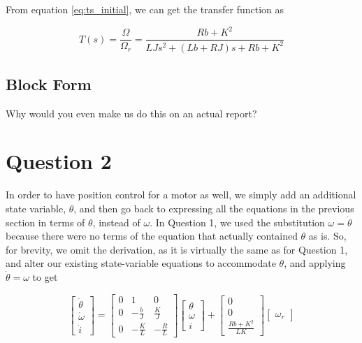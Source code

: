 \documentclass[a4paper, 12pt]{article}
\begin{document}
From equation \eqref{eq:ts_initial}, we can get the transfer function as

\begin{equation}
  T(s) = \frac{\Omega}{\Omega_r} = \frac{Rb + K^2}{LJs^2 + (Lb + RJ)s + Rb + K^2}
  \label{eq:ts_final}
\end{equation}

\subsection{Block Form}

Why would you even make us do this on an actual report?



\section{Question 2}
In order to have position control for a motor as well, we simply add an
additional state variable, $\theta$, and then go back to expressing all the
equations in the previous section in terms of $\theta$, instead of $\omega$. In
Question 1, we used the substitution $\omega = \dot\theta$ because there were
no terms of the equation that actually contained $\theta$ as is. So, for
brevity, we omit the derivation, as it is virtually the same as for Question 1,
and alter our existing state-variable equations to accommodate $\theta$, and
applying $\dot\theta = \omega$ to get

\begin{equation}
  \left[
  \begin{array}{c}
    \dot \theta \\
    \dot \omega \\
    \dot i
  \end{array}
  \right]
  =
  \left[
  \begin{array}{ccc}
    0 & 1 & 0 \\
    0 & -\frac{b}{J} & \frac{K}{J} \\
    0 & -\frac{K}{L} & -\frac{R}{L}
  \end{array}
  \right]
  \left[
  \begin{array}{c}
    \theta \\
    \omega \\
    i
  \end{array}
  \right]
  +
  \left[
  \begin{array}{c}
    0 \\
    0 \\
    \frac{Rb + K^2}{LK}
  \end{array}
  \right]
  \left[
  \begin{array}{c}
    \omega_r
  \end{array}
  \right]
  \label{eq:ss_position_eq1}
\end{equation}
\end{document}

